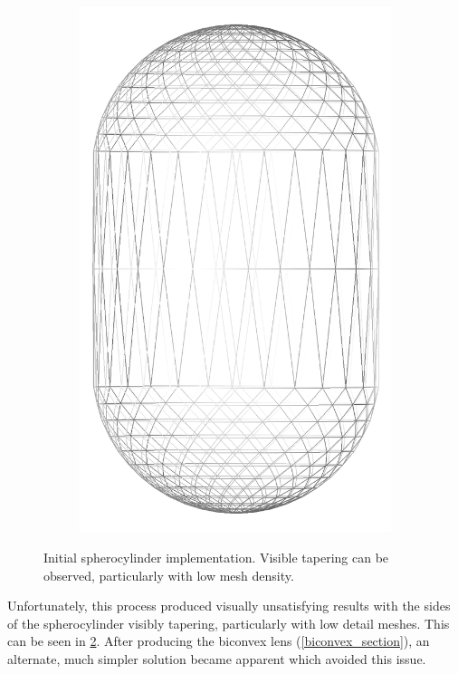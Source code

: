 \begin{figure}
\begin{center}
\begin{subfigure}{0.3\textwidth}
      \includegraphics[width=\textwidth]{assets/images/shapes/sphero_bug/high_2}
      \caption{}
      \label{fig:sphero_bug_high_2}
    \end{subfigure}
  \end{center}
  \caption{Initial spherocylinder implementation. Visible tapering can be observed, particularly with low mesh density.}
  \label{fig:sphero_bug}
\end{figure}
Unfortunately, this process produced visually unsatisfying results with the sides of the spherocylinder visibly tapering, particularly with low detail meshes. This can be seen in \cref{fig:sphero_bug}. After producing the biconvex lens (\cref{biconvex_section}), an alternate, much simpler solution became apparent which avoided this issue.
